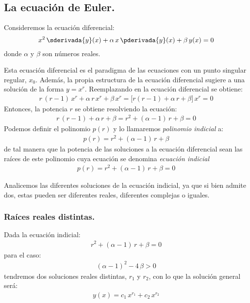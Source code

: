 \subsection{La ecuación de Euler.}

Consideremos la ecuación diferencial:
\begin{align}
x^{2} \, \sderivada{y} (x) + \alpha \, x \, \pderivada{y} (x) + \beta \, y (x) = 0
\label{eq:ecuacion_09}
\end{align}
donde $\alpha$ y $\beta$ son números reales.
\par
Esta ecuación diferencial es el paradigma de las ecuaciones con un punto singular regular, $x_{0}$. Además, la propia estructura de la ecuación diferencial sugiere a una solución de la forma $y = x^{r}$. Reemplazando en la ecuación diferencial se obtiene:
\begin{align*}
r \, (r - 1) \, x^{r} + \alpha \, r \, x^{r} + \beta \, x^{r} = \big[ r (r - 1) + \alpha \, r + \beta \big] \, x^{r} = 0
\end{align*}
Entonces, la potencia $r$ se obtiene resolviendo la ecuación:
\begin{align*}
r \, (r - 1) + \alpha \, r + \beta = r^{2} + (\alpha - 1) \, r + \beta = 0
\end{align*}
Podemos definir el polinomio $p (r)$ y lo llamaremos \emph{polinomio indicial} a:
\begin{align}
p (r) = r^{2} + (\alpha - 1) \, r + \beta
\label{eq:ecuacion_10}
\end{align}
de tal manera que la potencia de las soluciones a la ecuación diferencial sean las raíces de este polinomio cuya ecuación se denomina \emph{ecuación indicial}
\begin{align}
p (r) = r^{2} + (\alpha - 1) \, r + \beta = 0
\label{eq:ecuacion_11}
\end{align}

Analicemos las diferentes soluciones de la ecuación indicial, ya que si bien admite dos, estas pueden ser diferentes reales, diferentes complejas o iguales.

\subsubsection{Raíces reales distintas.}

Dada la ecuación indicial:
\begin{align*}
r^{2} + (\alpha - 1) \, r + \beta = 0
\end{align*}
para el caso:
\begin{align*}
(\alpha - 1)^{2} - 4 \, \beta > 0
\end{align*}
tendremos dos soluciones reales distintas, $r_{1}$ y $r_{2}$, con lo que la solución general será:
\begin{align}
y (x) = c_{1} \, x^{r_{1}} + c_{2} \, x^{r_{2}}
\label{eq:ecuacion_12}
\end{align}

